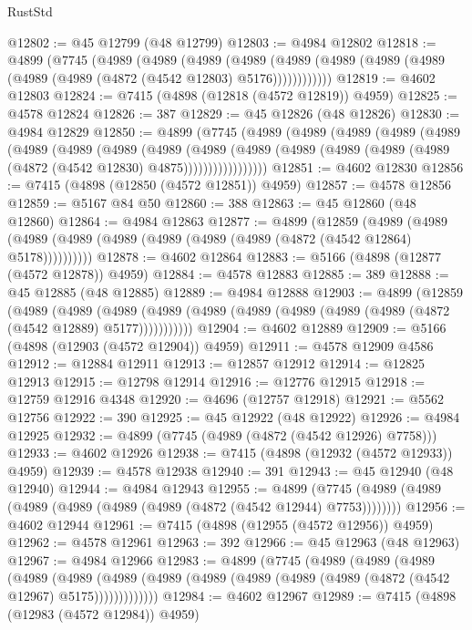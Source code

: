 \begin{lexlean}{RustStd}
\begin{coremodule}
@12802 := @45 @12799 (@48 @12799)
@12803 := @4984 @12802
@12818 := @4899
    (@7745
      (@4989
        (@4989
          (@4989
            (@4989 (@4989 (@4989 (@4989 (@4989 (@4989 (@4989 (@4872 (@4542 @12803) @5176))))))))))))
@12819 := @4602 @12803
@12824 := @7415 (@4898 (@12818 (@4572 @12819)) @4959)
@12825 := @4578 @12824
@12826 := 387
@12829 := @45 @12826 (@48 @12826)
@12830 := @4984 @12829
@12850 := @4899
    (@7745
      (@4989
        (@4989
          (@4989
            (@4989
              (@4989
                (@4989
                  (@4989
                    (@4989
                      (@4989
                        (@4989
                          (@4989
                            (@4989 (@4989 (@4989 (@4989 (@4872 (@4542 @12830) @4875)))))))))))))))))
@12851 := @4602 @12830
@12856 := @7415 (@4898 (@12850 (@4572 @12851)) @4959)
@12857 := @4578 @12856
@12859 := @5167 @84 @50
@12860 := 388
@12863 := @45 @12860 (@48 @12860)
@12864 := @4984 @12863
@12877 := @4899
    (@12859
      (@4989 (@4989 (@4989 (@4989 (@4989 (@4989 (@4989 (@4989 (@4872 (@4542 @12864) @5178))))))))))
@12878 := @4602 @12864
@12883 := @5166 (@4898 (@12877 (@4572 @12878)) @4959)
@12884 := @4578 @12883
@12885 := 389
@12888 := @45 @12885 (@48 @12885)
@12889 := @4984 @12888
@12903 := @4899
    (@12859
      (@4989
        (@4989
          (@4989 (@4989 (@4989 (@4989 (@4989 (@4989 (@4989 (@4872 (@4542 @12889) @5177)))))))))))
@12904 := @4602 @12889
@12909 := @5166 (@4898 (@12903 (@4572 @12904)) @4959)
@12911 := @4578 @12909 @4586
@12912 := @12884 @12911
@12913 := @12857 @12912
@12914 := @12825 @12913
@12915 := @12798 @12914
@12916 := @12776 @12915
@12918 := @12759 @12916 @4348
@12920 := @4696 (@12757 @12918)
@12921 := @5562 @12756
@12922 := 390
@12925 := @45 @12922 (@48 @12922)
@12926 := @4984 @12925
@12932 := @4899 (@7745 (@4989 (@4872 (@4542 @12926) @7758)))
@12933 := @4602 @12926
@12938 := @7415 (@4898 (@12932 (@4572 @12933)) @4959)
@12939 := @4578 @12938
@12940 := 391
@12943 := @45 @12940 (@48 @12940)
@12944 := @4984 @12943
@12955 := @4899 (@7745 (@4989 (@4989 (@4989 (@4989 (@4989 (@4989 (@4872 (@4542 @12944) @7753))))))))
@12956 := @4602 @12944
@12961 := @7415 (@4898 (@12955 (@4572 @12956)) @4959)
@12962 := @4578 @12961
@12963 := 392
@12966 := @45 @12963 (@48 @12963)
@12967 := @4984 @12966
@12983 := @4899
    (@7745
      (@4989
        (@4989
          (@4989
            (@4989
              (@4989
                (@4989 (@4989 (@4989 (@4989 (@4989 (@4989 (@4872 (@4542 @12967) @5175)))))))))))))
@12984 := @4602 @12967
@12989 := @7415 (@4898 (@12983 (@4572 @12984)) @4959)

\end{coremodule}
\end{lexlean}

